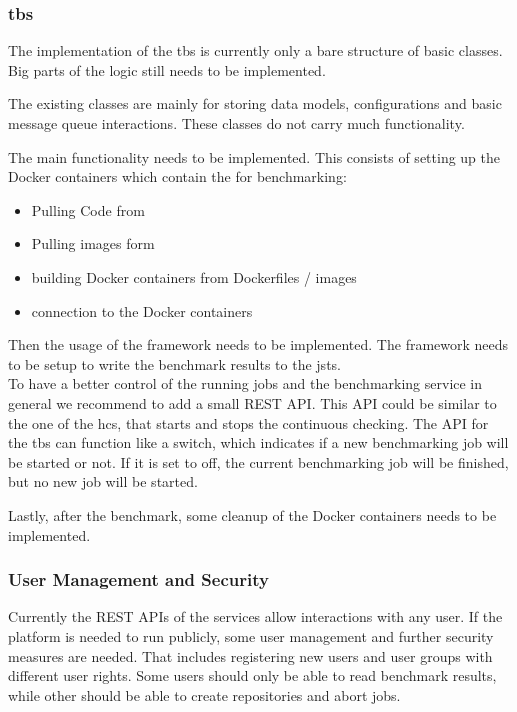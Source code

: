 \subsubsection{\acl{tbs}}
The implementation of the \acl{tbs} is currently only a bare structure of basic classes.
Big parts of the logic still needs to be implemented.

The existing classes are mainly for storing data models, configurations and basic message queue interactions.
These classes do not carry much functionality.

The main functionality needs to be implemented.
This consists of setting up the Docker containers which contain the \tsp{} for benchmarking:

\begin{itemize}
	\item Pulling Code from \gh{}
	\item Pulling images form \dockh{}
	
	\item building Docker containers from Dockerfiles / images
	
	\item connection to the Docker containers
\end{itemize}

Then the usage of the \iguana{} framework needs to be implemented.
The framework needs to be setup to write the benchmark results to the \acl{jsts}.
\\

To have a better control of the running jobs and the benchmarking service in general we recommend to add a small REST API.
This API could be similar to the one of the \ac{hcs}, that starts and stops the continuous checking.
The API for the \ac{tbs} can function like a switch, which indicates if a new benchmarking job will be started or not.
If it is set to off, the current benchmarking job will be finished, but no new job will be started.

Lastly, after the benchmark, some cleanup of the Docker containers needs to be implemented.

\subsubsection{User Management and Security}
\label{sec:review_user_management}
Currently the REST APIs of the services allow interactions with any user.
If the platform is needed to run publicly, some user management and further security measures are needed.
That includes registering new users and user groups with different user rights.
Some users should only be able to read benchmark results, while other should be able to create repositories and abort jobs.

